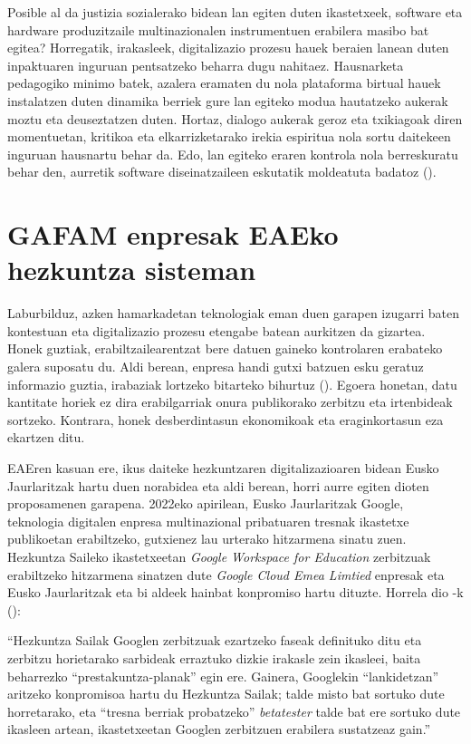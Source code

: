 Posible al da justizia sozialerako bidean lan egiten duten ikastetxeek, software eta hardware produzitzaile multinazionalen instrumentuen erabilera masibo bat egitea? Horregatik, irakasleek, digitalizazio prozesu hauek beraien lanean duten inpaktuaren inguruan pentsatzeko beharra dugu nahitaez. Hausnarketa pedagogiko minimo batek, azalera eramaten du nola plataforma birtual hauek instalatzen duten dinamika berriek gure lan egiteko modua hautatzeko aukerak moztu eta deuseztatzen duten. Hortaz, dialogo aukerak geroz eta txikiagoak diren momentuetan, kritikoa eta elkarrizketarako irekia espiritua nola sortu daitekeen inguruan hausnartu behar da. Edo, lan egiteko eraren kontrola nola berreskuratu behar den, aurretik software diseinatzaileen eskutatik moldeatuta badatoz (\cite{almazan2020covid}).

\section{GAFAM enpresak EAEko hezkuntza sisteman}\label{sec:gafam_eae_hezkuntza}

Laburbilduz, azken hamarkadetan teknologiak eman duen garapen izugarri baten kontestuan eta digitalizazio prozesu etengabe batean aurkitzen da gizartea. Honek guztiak, erabiltzailearentzat bere datuen gaineko kontrolaren erabateko galera suposatu du. Aldi berean, enpresa handi gutxi batzuen esku geratuz informazio guztia, irabaziak lortzeko bitarteko bihurtuz (\cite{decode2017what}). Egoera honetan, datu kantitate horiek ez dira erabilgarriak onura publikorako zerbitzu eta irtenbideak sortzeko. Kontrara, honek desberdintasun ekonomikoak eta eraginkortasun eza ekartzen ditu.

EAEren kasuan ere, ikus daiteke hezkuntzaren digitalizazioaren bidean Eusko Jaurlaritzak hartu duen norabidea eta aldi berean, horri aurre egiten dioten proposamenen garapena. 2022eko apirilean, Eusko Jaurlaritzak Google, teknologia digitalen enpresa multinazional pribatuaren tresnak ikastetxe publikoetan erabiltzeko, gutxienez lau urterako hitzarmena sinatu zuen. Hezkuntza Saileko ikastetxeetan \textit{Google Workspace for Education} zerbitzuak erabiltzeko hitzarmena sinatzen dute \textit{Google Cloud Emea Limtied} enpresak eta Eusko Jaurlaritzak eta bi aldeek hainbat konpromiso hartu dituzte. Horrela dio \citeauthor{apaolaza2022google}-k (\citeyear{apaolaza2022google}):

\begin{adjustwidth}{3em}{0pt}
“Hezkuntza Sailak Googlen zerbitzuak ezartzeko faseak definituko ditu eta zerbitzu horietarako sarbideak erraztuko dizkie irakasle zein ikasleei, baita beharrezko “prestakuntza-planak” egin ere. Gainera, Googlekin “lankidetzan” aritzeko konpromisoa hartu du Hezkuntza Sailak; talde misto bat sortuko dute horretarako, eta “tresna berriak probatzeko” \textit{betatester} talde bat ere sortuko dute ikasleen artean, ikastetxeetan Googlen zerbitzuen erabilera sustatzeaz gain.”
\end{adjustwidth}

